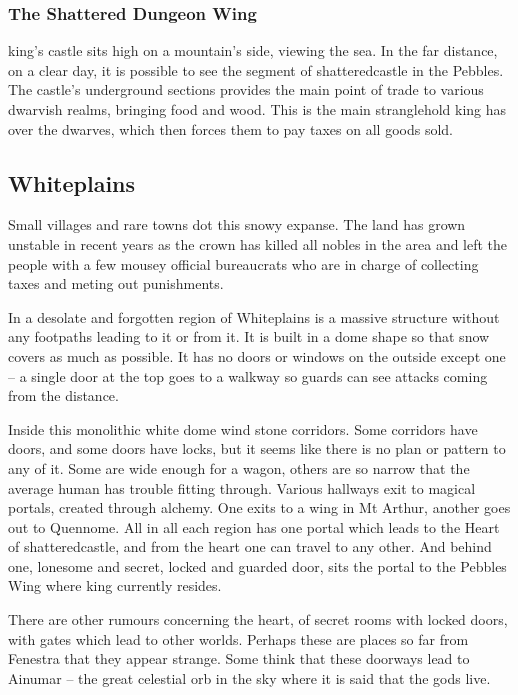 \begin{multicols}{2}
\subsubsection{The Shattered Dungeon Wing}

\Gls{king}'s castle sits high on a mountain's side, viewing the sea.
In the far distance, on a clear day, it is possible to see the segment of \gls{shatteredcastle} in the Pebbles.
The castle's underground sections provides the main point of trade to various dwarvish realms, bringing food and wood.
This is the main stranglehold \gls{king} has over the dwarves, which then forces them to pay taxes on all goods sold.


\subsection{Whiteplains}

Small villages and rare towns dot this snowy expanse.  The land has grown unstable in recent years as the crown has killed all nobles in the area and left the people with a few mousey official bureaucrats who are in charge of collecting taxes and meting out punishments.

In a desolate and forgotten region of Whiteplains is a massive structure without any footpaths leading to it or from it.
It is built in a dome shape so that snow covers as much as possible.
It has no doors or windows on the outside except one -- a single door at the top goes to a walkway so guards can see attacks coming from the distance.

Inside this monolithic white dome wind stone corridors.
Some corridors have doors, and some doors have locks, but it seems like there is no plan or pattern to any of it.
Some are wide enough for a wagon, others are so narrow that the average human has trouble fitting through.
Various hallways exit to magical portals, created through alchemy.
One exits to a wing in Mt Arthur, another goes out to Quennome.
All in all each region has one portal which leads to the Heart of \gls{shatteredcastle}, and from the heart one can travel to any other.
And behind one, lonesome and secret, locked and guarded door, sits the portal to the Pebbles Wing where \gls{king} currently resides.

There are other rumours concerning the heart, of secret rooms with locked doors, with gates which lead to other worlds.  Perhaps these are places so far from Fenestra that they appear strange.  Some think that these doorways lead to Ainumar -- the great celestial orb in the sky where it is said that the gods live.


\end{multicols}
